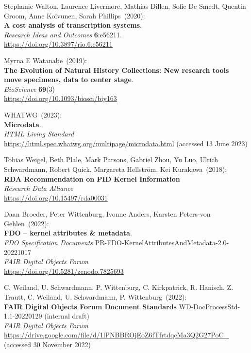 \begin{thebibliography}{9}
Stephanie Walton, Laurence Livermore, Mathias Dillen, Sofie De Smedt, Quentin Groom, Anne Koivunen, Sarah Phillips~(2020): \\
\textbf{A cost analysis of transcription systems}. \\
\emph{Research Ideas and Outcomes} \textbf{6}:e56211.\\
\url{https://doi.org/10.3897/rio.6.e56211}

Myrna E Watanabe~(2019): \\
\textbf{The Evolution of Natural History Collections: New research tools move specimens, data to center stage}.\\
\emph{BioScience} \textbf{69}(3)\\
\url{https://doi.org/10.1093/biosci/biy163}

WHATWG~(2023): \\
\textbf{Microdata}. \\
\emph{{HTML Living Standard}}\\
\url{https://html.spec.whatwg.org/multipage/microdata.html} (accessed 13
June 2023)


Tobias Weigel, Beth Plale, Mark Parsons, Gabriel Zhou, Yu Luo, Ulrich Schwardmann, Robert Quick, Margareta Hellström, Kei Kurakawa~(2018): \\
\textbf{{RDA Recommendation} on {PID Kernel Information}} \\
\emph{Research Data Alliance}\\
\url{https://doi.org/10.15497/rda00031}

Daan Broeder, Peter Wittenburg, Ivonne Anders, Karsten Peters-von Gehlen~(2022): \\
\textbf{FDO -- kernel attributes \& metadata}.\\ 
\emph{FDO Specification Documents} PR-FDO-KernelAttributesAndMetadata-2.0-20221017 \\
\emph{FAIR Digital Objects Forum}\\
\url{https://doi.org/10.5281/zenodo.7825693}

C. Weiland, U. Schwardmann, P. Wittenburg, C. Kirkpatrick, R. Hanisch, Z. Trautt, C. Weiland, U. Schwardmann, P. Wittenburg~(2022): \\
\textbf{{FAIR Digital Objects Forum Document Standards}} WD-DocProcessStd-1.1-20220129 (internal draft) \\
\emph{FAIR Digital Objects Forum}\\
\url{https://drive.google.com/file/d/1lPNBBROjEoZ6fTfrtdqcMa3Q2G27PoC_}
(accessed 30 November 2022)


\end{thebibliography}

